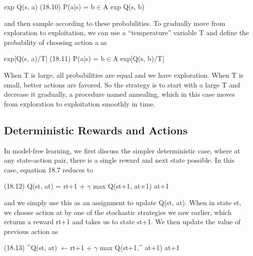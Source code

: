 exp Q(s, a) (18.10) P(a|s) = b$\in$A exp Q(s, b)

and then sample according to these probabilities. To gradually move from exploration to exploitation, we can use a “temperature” variable T and define the probability of choosing action a as

exp[Q(s, a)/T] (18.11) P(a|s) = b$\in$A exp[Q(s, b)/T]

When T is large, all probabilities are equal and we have exploration. When T is small, better actions are favored. So the strategy is to start with a large T and decrease it gradually, a procedure named annealing, which in this case moves from exploration to exploitation smoothly in time.

\subsection{Deterministic Rewards and Actions}

In model-free learning, we first discuss the simpler deterministic case, where at any state-action pair, there is a single reward and next state possible. In this case, equation 18.7 reduces to

(18.12) Q(st, at) = rt+1 + $\gamma$ max Q(st+1, at+1) at+1

and we simply use this as an assignment to update Q(st, at). When in state st, we choose action at by one of the stochastic strategies we saw earlier, which returns a reward rt+1 and takes us to state st+1. We then update the value of previous action as

(18.13) \textasciicircum{}Q(st, at) $\leftarrow$rt+1 + $\gamma$ max Q(st+1,\textasciicircum{} at+1) at+1

